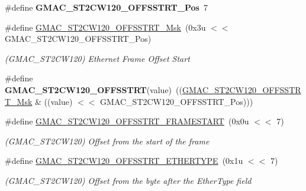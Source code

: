 \begin{DoxyCompactItemize}
\item 
\mbox{\label{group__SAMV71__GMAC_ga08faf662a0b169bc8ce575f01b291f53}} 
\#define {\bfseries G\+M\+A\+C\+\_\+\+S\+T2\+C\+W120\+\_\+\+O\+F\+F\+S\+S\+T\+R\+T\+\_\+\+Pos}~7
\item 
\mbox{\label{group__SAMV71__GMAC_ga6e8493c4d9acaf8f5c3e81822b2cbfaa}} 
\#define \mbox{\hyperlink{group__SAMV71__GMAC_ga6e8493c4d9acaf8f5c3e81822b2cbfaa}{G\+M\+A\+C\+\_\+\+S\+T2\+C\+W120\+\_\+\+O\+F\+F\+S\+S\+T\+R\+T\+\_\+\+Msk}}~(0x3u $<$$<$ G\+M\+A\+C\+\_\+\+S\+T2\+C\+W120\+\_\+\+O\+F\+F\+S\+S\+T\+R\+T\+\_\+\+Pos)
\begin{DoxyCompactList}\small\item\em (G\+M\+A\+C\+\_\+\+S\+T2\+C\+W120) Ethernet Frame Offset Start \end{DoxyCompactList}\item 
\mbox{\label{group__SAMV71__GMAC_ga70a788160001c300643ab515ad7d098e}} 
\#define {\bfseries G\+M\+A\+C\+\_\+\+S\+T2\+C\+W120\+\_\+\+O\+F\+F\+S\+S\+T\+RT}(value)~((\mbox{\hyperlink{group__SAMV71__GMAC_ga6e8493c4d9acaf8f5c3e81822b2cbfaa}{G\+M\+A\+C\+\_\+\+S\+T2\+C\+W120\+\_\+\+O\+F\+F\+S\+S\+T\+R\+T\+\_\+\+Msk}} \& ((value) $<$$<$ G\+M\+A\+C\+\_\+\+S\+T2\+C\+W120\+\_\+\+O\+F\+F\+S\+S\+T\+R\+T\+\_\+\+Pos)))
\item 
\mbox{\label{group__SAMV71__GMAC_ga47d76bc97dc59999215727aee7a738d5}} 
\#define \mbox{\hyperlink{group__SAMV71__GMAC_ga47d76bc97dc59999215727aee7a738d5}{G\+M\+A\+C\+\_\+\+S\+T2\+C\+W120\+\_\+\+O\+F\+F\+S\+S\+T\+R\+T\+\_\+\+F\+R\+A\+M\+E\+S\+T\+A\+RT}}~(0x0u $<$$<$ 7)
\begin{DoxyCompactList}\small\item\em (G\+M\+A\+C\+\_\+\+S\+T2\+C\+W120) Offset from the start of the frame \end{DoxyCompactList}\item 
\mbox{\label{group__SAMV71__GMAC_ga61bc63b2cf5848b3131afe7ca044c5d5}} 
\#define \mbox{\hyperlink{group__SAMV71__GMAC_ga61bc63b2cf5848b3131afe7ca044c5d5}{G\+M\+A\+C\+\_\+\+S\+T2\+C\+W120\+\_\+\+O\+F\+F\+S\+S\+T\+R\+T\+\_\+\+E\+T\+H\+E\+R\+T\+Y\+PE}}~(0x1u $<$$<$ 7)
\begin{DoxyCompactList}\small\item\em (G\+M\+A\+C\+\_\+\+S\+T2\+C\+W120) Offset from the byte after the Ether\+Type field \end{DoxyCompactList}\item 

\end{DoxyCompactItemize}
